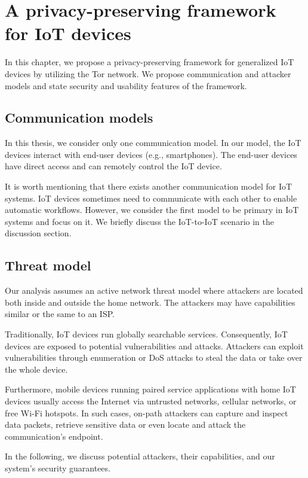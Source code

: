 \chapter{A privacy-preserving framework for IoT devices}

In this chapter, we propose a privacy-preserving framework for generalized IoT devices by utilizing the Tor network. We propose communication and attacker models and state security and usability features of the framework.

\section{Communication models}

In this thesis, we consider only one communication model. In our model, the IoT devices interact with end-user devices (e.g., smartphones). The end-user devices have direct access and can remotely control the IoT device. 

It is worth mentioning that there exists another communication model for IoT systems. IoT devices sometimes need to communicate with each other to enable automatic workflows. However, we consider the first model to be primary in IoT systems and focus on it. We briefly discuss the IoT-to-IoT scenario in the discussion section. 

\section{Threat model}

Our analysis assumes an active network threat model where attackers are located both inside and outside the home network. The attackers may have capabilities similar or the same to an ISP.

Traditionally, IoT devices run globally searchable services\cite{antonakakis2017understanding}. Consequently, IoT devices are exposed to potential vulnerabilities and attacks. Attackers can exploit vulnerabilities through enumeration or DoS attacks to steal the data or take over the whole device.

Furthermore, mobile devices running paired service applications with home IoT devices usually access the Internet via untrusted networks, cellular networks, or free Wi-Fi hotspots. In such cases, on-path attackers can capture and inspect data packets, retrieve sensitive data or even locate and attack the communication's endpoint. 

In the following, we discuss potential attackers, their capabilities, and our system's security guarantees.

